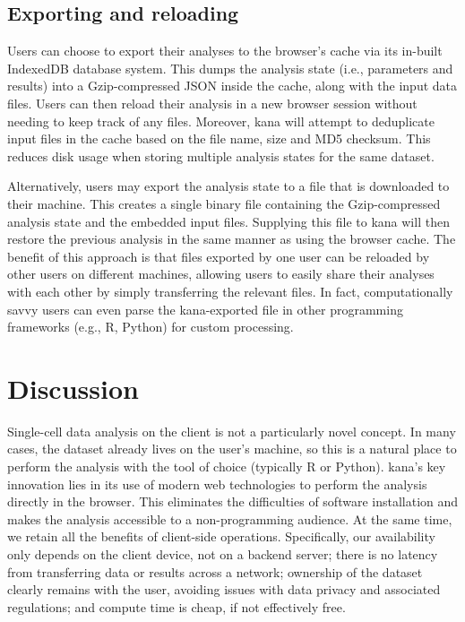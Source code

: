 \documentclass{article}
\begin{document}
\subsection{Exporting and reloading}

Users can choose to export their analyses to the browser's cache via its in-built IndexedDB database system.
This dumps the analysis state (i.e., parameters and results) into a Gzip-compressed JSON inside the cache, along with the input data files.
Users can then reload their analysis in a new browser session without needing to keep track of any files.
Moreover, kana will attempt to deduplicate input files in the cache based on the file name, size and MD5 checksum.
This reduces disk usage when storing multiple analysis states for the same dataset. 

Alternatively, users may export the analysis state to a file that is downloaded to their machine.
This creates a single binary file containing the Gzip-compressed analysis state and the embedded input files.
Supplying this file to kana will then restore the previous analysis in the same manner as using the browser cache.
The benefit of this approach is that files exported by one user can be reloaded by other users on different machines,
allowing users to easily share their analyses with each other by simply transferring the relevant files.
In fact, computationally savvy users can even parse the kana-exported file in other programming frameworks (e.g., R, Python) for custom processing.

\section{Discussion}

Single-cell data analysis on the client is not a particularly novel concept.
In many cases, the dataset already lives on the user's machine, so this is a natural place to perform the analysis with the tool of choice (typically R or Python).
kana's key innovation lies in its use of modern web technologies to perform the analysis directly in the browser.
This eliminates the difficulties of software installation and makes the analysis accessible to a non-programming audience.
At the same time, we retain all the benefits of client-side operations.
Specifically, our availability only depends on the client device, not on a backend server;
there is no latency from transferring data or results across a network;
ownership of the dataset clearly remains with the user, avoiding issues with data privacy and associated regulations;
and compute time is cheap, if not effectively free.
\end{document}
